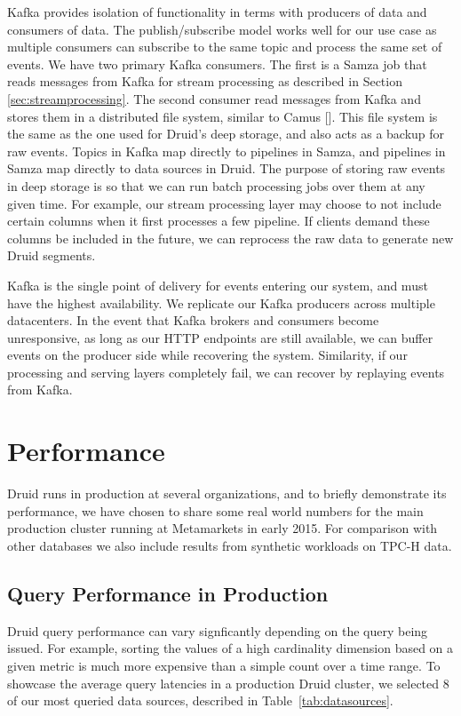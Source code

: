 \documentclass{vldb}
\begin{document}
Kafka provides isolation of functionality in terms with producers of data and
consumers of data. The publish/subscribe model works well for our use case as
multiple consumers can subscribe to the same topic and process the same set of
events. We have two primary Kafka consumers. The first is a Samza job that
reads messages from Kafka for stream processing as described in Section
\ref{sec:streamprocessing}. The second consumer read messages from Kafka and
stores them in a distributed file system, similar to Camus []. This file system
is the same as the one used for Druid’s deep storage, and also acts as a backup
for raw events. Topics in Kafka map directly to pipelines in Samza, and
pipelines in Samza map directly to data sources in Druid. The purpose of
storing raw events in deep storage is so that we can run batch processing jobs
over them at any given time. For example, our stream processing layer may
choose to not include certain columns when it first processes a few pipeline.
If clients demand these columns be included in the future, we can reprocess the
raw data to generate new Druid segments. 

Kafka is the single point of delivery for events entering our system, and must
have the highest availability. We replicate our Kafka producers across multiple
datacenters. In the event that Kafka brokers and consumers become unresponsive,
as long as our HTTP endpoints are still available, we can buffer events on the
producer side while recovering the system. Similarity, if our processing and
serving layers completely fail, we can recover by replaying events from Kafka.

\section{Performance}
\label{sec:performance}
Druid runs in production at several organizations, and to briefly demonstrate
its performance, we have chosen to share some real world numbers for the main
production cluster running at Metamarkets in early 2015. For comparison with
other databases we also include results from synthetic workloads on TPC-H data.

\subsection{Query Performance in Production}
Druid query performance can vary signficantly depending on the query being
issued. For example, sorting the values of a high cardinality dimension based
on a given metric is much more expensive than a simple count over a time range.
To showcase the average query latencies in a production Druid cluster, we
selected 8 of our most queried data sources, described in
Table~\ref{tab:datasources}.
\end{document}
